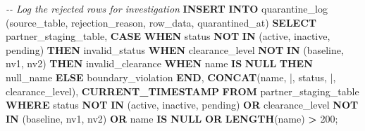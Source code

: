 \documentclass[a4paper,11pt]{report}
\newenvironment{Shaded}{\begin{snugshade}}{\end{snugshade}}
\newcommand{\CommentTok}[1]{\textcolor[rgb]{0.56,0.35,0.01}{\textit{#1}}}
\newcommand{\ControlFlowTok}[1]{\textcolor[rgb]{0.13,0.29,0.53}{\textbf{#1}}}
\newcommand{\DecValTok}[1]{\textcolor[rgb]{0.00,0.00,0.81}{#1}}
\newcommand{\FunctionTok}[1]{\textcolor[rgb]{0.13,0.29,0.53}{\textbf{#1}}}
\newcommand{\KeywordTok}[1]{\textcolor[rgb]{0.13,0.29,0.53}{\textbf{#1}}}
\newcommand{\NormalTok}[1]{#1}
\newcommand{\OperatorTok}[1]{\textcolor[rgb]{0.81,0.36,0.00}{\textbf{#1}}}
\newcommand{\StringTok}[1]{\textcolor[rgb]{0.31,0.60,0.02}{#1}}
\begin{document}
\begin{Shaded}
\begin{Highlighting}[]
\CommentTok{{-}{-} Log the rejected rows for investigation}
\KeywordTok{INSERT} \KeywordTok{INTO}\NormalTok{ quarantine\_log (source\_table, rejection\_reason, row\_data, quarantined\_at)}
\KeywordTok{SELECT}
    \StringTok{\textquotesingle{}partner\_staging\_table\textquotesingle{}}\NormalTok{,}
    \ControlFlowTok{CASE}
        \ControlFlowTok{WHEN}\NormalTok{ status }\KeywordTok{NOT} \KeywordTok{IN}\NormalTok{ (}\StringTok{\textquotesingle{}active\textquotesingle{}}\NormalTok{, }\StringTok{\textquotesingle{}inactive\textquotesingle{}}\NormalTok{, }\StringTok{\textquotesingle{}pending\textquotesingle{}}\NormalTok{) }\ControlFlowTok{THEN} \StringTok{\textquotesingle{}invalid\_status\textquotesingle{}}
        \ControlFlowTok{WHEN}\NormalTok{ clearance\_level }\KeywordTok{NOT} \KeywordTok{IN}\NormalTok{ (}\StringTok{\textquotesingle{}baseline\textquotesingle{}}\NormalTok{, }\StringTok{\textquotesingle{}nv1\textquotesingle{}}\NormalTok{, }\StringTok{\textquotesingle{}nv2\textquotesingle{}}\NormalTok{) }\ControlFlowTok{THEN} \StringTok{\textquotesingle{}invalid\_clearance\textquotesingle{}}
        \ControlFlowTok{WHEN}\NormalTok{ name }\KeywordTok{IS} \KeywordTok{NULL} \ControlFlowTok{THEN} \StringTok{\textquotesingle{}null\_name\textquotesingle{}}
        \ControlFlowTok{ELSE} \StringTok{\textquotesingle{}boundary\_violation\textquotesingle{}}
    \ControlFlowTok{END}\NormalTok{,}
    \FunctionTok{CONCAT}\NormalTok{(name, }\StringTok{\textquotesingle{}|\textquotesingle{}}\NormalTok{, status, }\StringTok{\textquotesingle{}|\textquotesingle{}}\NormalTok{, clearance\_level),}
    \FunctionTok{CURRENT\_TIMESTAMP}
\KeywordTok{FROM}\NormalTok{ partner\_staging\_table}
\KeywordTok{WHERE}\NormalTok{ status }\KeywordTok{NOT} \KeywordTok{IN}\NormalTok{ (}\StringTok{\textquotesingle{}active\textquotesingle{}}\NormalTok{, }\StringTok{\textquotesingle{}inactive\textquotesingle{}}\NormalTok{, }\StringTok{\textquotesingle{}pending\textquotesingle{}}\NormalTok{)}
   \KeywordTok{OR}\NormalTok{ clearance\_level }\KeywordTok{NOT} \KeywordTok{IN}\NormalTok{ (}\StringTok{\textquotesingle{}baseline\textquotesingle{}}\NormalTok{, }\StringTok{\textquotesingle{}nv1\textquotesingle{}}\NormalTok{, }\StringTok{\textquotesingle{}nv2\textquotesingle{}}\NormalTok{)}
   \KeywordTok{OR}\NormalTok{ name }\KeywordTok{IS} \KeywordTok{NULL}
   \KeywordTok{OR} \FunctionTok{LENGTH}\NormalTok{(name) }\OperatorTok{\textgreater{}} \DecValTok{200}\NormalTok{;}
\end{Highlighting}
\end{Shaded}
\end{document}
